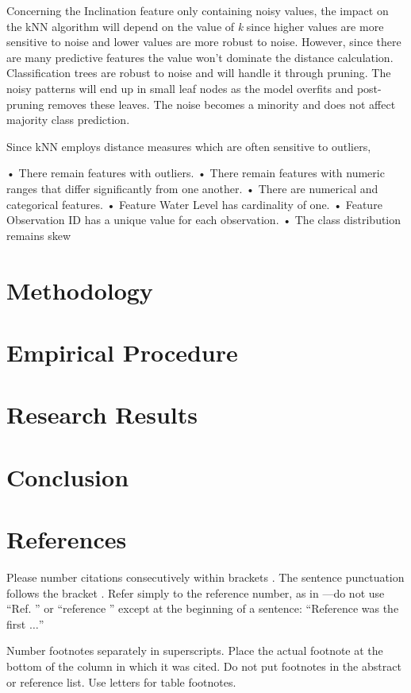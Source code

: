 \documentclass[conference]{IEEEtran}
\begin{document}
Concerning the Inclination feature only containing noisy values, the impact on the kNN algorithm will depend on the value of \textit{k} since higher values are more sensitive to noise and lower values are more robust to noise. However, since there are many predictive features the value won't dominate the distance calculation. Classification trees are robust to noise and will handle it through pruning. The noisy patterns will end up in small leaf nodes as the model overfits and post-pruning removes these leaves. The noise becomes a minority and does not affect majority class prediction.

Since kNN employs distance measures which are often sensitive to outliers,


• There remain features with outliers.
• There remain features with numeric ranges that differ significantly from one another.
• There are numerical and categorical features.
• Feature Water Level has cardinality of one.
• Feature Observation ID has a unique value for each observation.
• The class distribution remains skew

\section{Methodology}
\section{Empirical Procedure}
\section{Research Results}
\section{Conclusion}
\section*{References}

Please number citations consecutively within brackets \cite{eason1955}. The 
sentence punctuation follows the bracket \cite{maxwell1892}. Refer simply to the reference 
number, as in \cite{jacobs1963}---do not use ``Ref. \cite{jacobs1963}'' or ``reference \cite{jacobs1963}'' except at 
the beginning of a sentence: ``Reference \cite{jacobs1963} was the first $\ldots$''

Number footnotes separately in superscripts. Place the actual footnote at 
the bottom of the column in which it was cited. Do not put footnotes in the 
abstract or reference list. Use letters for table footnotes.
\end{document}
